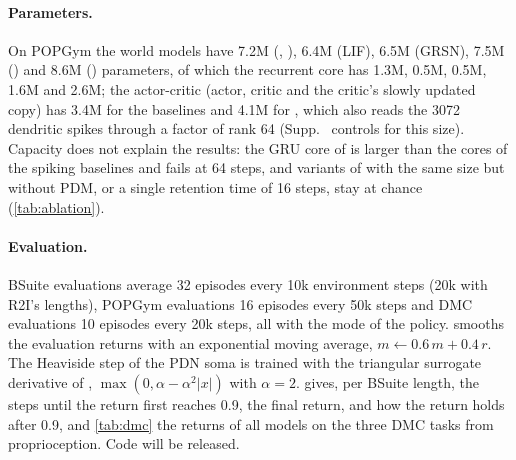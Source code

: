 \paragraph{Parameters.}
On POPGym the world models have 7.2M (\swm, \swmnr), 6.4M (LIF), 6.5M (GRSN), 7.5M (\dv) and 8.6M (\method) parameters, of which the recurrent core has 1.3M, 0.5M, 0.5M, 1.6M and 2.6M; the actor-critic (actor, critic and the critic's slowly updated copy) has 3.4M for the baselines and 4.1M for \method, which also reads the 3072 dendritic spikes through a factor of rank 64 (Supp.~ controls for this size).
Capacity does not explain the results: the GRU core of \dv is larger than the cores of the spiking baselines and fails at 64 steps, and variants of \method with the same size but without PDM, or a single retention time of 16 steps, stay at chance (\cref{tab:ablation}).


\paragraph{Evaluation.}
BSuite evaluations average 32 episodes every 10k environment steps (20k with R2I's lengths), POPGym evaluations 16 episodes every 50k steps and DMC evaluations 10 episodes every 20k steps, all with the mode of the policy.
 smooths the evaluation returns with an exponential moving average, $m \leftarrow 0.6\,m + 0.4\,r$.
The Heaviside step of the PDN soma is trained with the triangular surrogate derivative of \swm, $\max(0,\alpha-\alpha^2|x|)$ with $\alpha=2$.
 gives, per BSuite length, the steps until the return first reaches 0.9, the final return, and how the return holds after 0.9, and \cref{tab:dmc} the returns of all models on the three DMC tasks from proprioception.
Code will be released.

\begin{table}[t]
  \centering\tabfont
  \setlength{\tabcolsep}{2.4pt}
  \caption{\textbf{BSuite in detail} (the success of \cref{tab:rl} is a return of 0.9 within the budget). Top: environment steps until the evaluation return first reaches 0.9 (-- = not within the budget). Middle: final return, mean of the last three evaluations. Bottom: mean return from the first 0.9 on, and in parentheses the fraction of those evaluations with a return of at least 0.5. $^\dagger$Lengths and budget of R2I, reported run as described in the text. : in progress; \nr: not run.}
  \label{tab:rl_detail}
  
\end{table}


